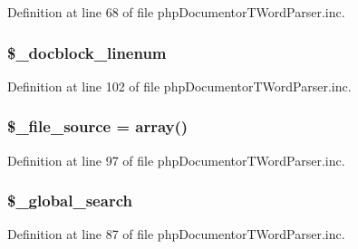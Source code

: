 \-Definition at line 68 of file php\-Documentor\-T\-Word\-Parser.\-inc.

\hypertarget{classphp_documentor_t_word_parser_a645b04691058117cccd24e9ff582caf8}{
\subsubsection[{\$\-\_\-docblock\-\_\-linenum}]{\setlength{\rightskip}{0pt plus 5cm}\$\-\_\-docblock\-\_\-linenum}}\label{classphp_documentor_t_word_parser_a645b04691058117cccd24e9ff582caf8}


\-Definition at line 102 of file php\-Documentor\-T\-Word\-Parser.\-inc.

\hypertarget{classphp_documentor_t_word_parser_a991f3c3abf320071ef8c5da6a3147c84}{
\subsubsection[{\$\-\_\-file\-\_\-source}]{\setlength{\rightskip}{0pt plus 5cm}\$\-\_\-file\-\_\-source = array()}}\label{classphp_documentor_t_word_parser_a991f3c3abf320071ef8c5da6a3147c84}


\-Definition at line 97 of file php\-Documentor\-T\-Word\-Parser.\-inc.

\hypertarget{classphp_documentor_t_word_parser_aa6f0188167941cb67266a257b9bec056}{
\subsubsection[{\$\-\_\-global\-\_\-search}]{\setlength{\rightskip}{0pt plus 5cm}\$\-\_\-global\-\_\-search}}\label{classphp_documentor_t_word_parser_aa6f0188167941cb67266a257b9bec056}


\-Definition at line 87 of file php\-Documentor\-T\-Word\-Parser.\-inc.

